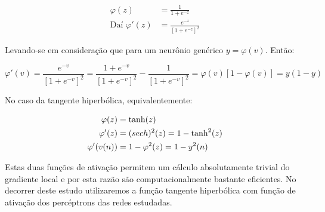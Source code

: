 \begin{align}
\varphi(z) &= \frac{1}{1 + e^{-z}} \\
\text{Daí } \varphi'(z) &= \frac{e^{-z}}{[1+e^{-z}]^2}
\end{align}

Levando-se em consideração que para um neurônio genérico $y =
\varphi(v)$. Então:

\begin{equation}
\varphi'(v) = \frac{e^{-v}}{[1+e^{-v}]^2} = \frac{1+e^{-v}}{[1+e^{-v}]^2} -
\frac{1}{[1+e^{-v}]^2} = \varphi(v)[1 - \varphi(v)] = y(1-y)
\end{equation}

No caso da tangente hiperbólica, equivalentemente:

\begin{align}
\varphi(z) &= \tanh(z) \\
\varphi'(z) &= \text(sech)^2(z) = 1 - \tanh^2(z) \\
\varphi'(v(n)) &= 1 - \varphi^2(z) = 1-y^2(n)
\end{align}

Estas duas funções de ativação permitem um cálculo absolutamente trivial do
gradiente local e por esta razão são computacionalmente bastante
eficientes. No decorrer deste estudo utilizaremos a função tangente
hiperbólica com função de ativação dos percéptrons das redes estudadas.

